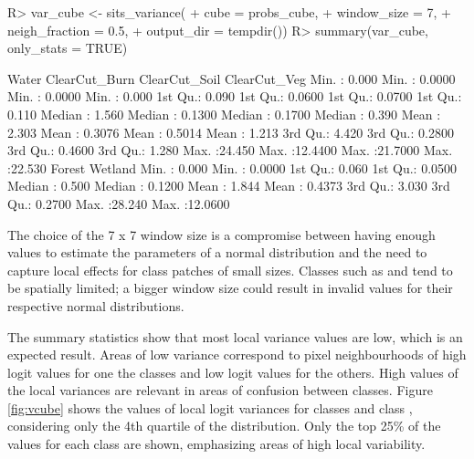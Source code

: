 \documentclass[
]{jss}
\begin{document}
\begin{CodeChunk}
\begin{CodeInput}
R> var_cube <- sits_variance(
+     cube = probs_cube,
+     window_size = 7,
+     neigh_fraction = 0.5,
+     output_dir = tempdir())
R> summary(var_cube, only_stats = TRUE)
\end{CodeInput}
\begin{CodeOutput}
 Water            ClearCut_Burn     ClearCut_Soil     ClearCut_Veg    
 Min.   : 0.000   Min.   : 0.0000   Min.   : 0.0000   Min.   : 0.000  
 1st Qu.: 0.090   1st Qu.: 0.0600   1st Qu.: 0.0700   1st Qu.: 0.110  
 Median : 1.560   Median : 0.1300   Median : 0.1700   Median : 0.390  
 Mean   : 2.303   Mean   : 0.3076   Mean   : 0.5014   Mean   : 1.213  
 3rd Qu.: 4.420   3rd Qu.: 0.2800   3rd Qu.: 0.4600   3rd Qu.: 1.280  
 Max.   :24.450   Max.   :12.4400   Max.   :21.7000   Max.   :22.530  
 Forest           Wetland          
 Min.   : 0.000   Min.   : 0.0000  
 1st Qu.: 0.060   1st Qu.: 0.0500  
 Median : 0.500   Median : 0.1200  
 Mean   : 1.844   Mean   : 0.4373  
 3rd Qu.: 3.030   3rd Qu.: 0.2700  
 Max.   :28.240   Max.   :12.0600  
\end{CodeOutput}
\end{CodeChunk}

The choice of the 7 x 7 window size is a compromise between having enough values to
estimate the parameters of a normal distribution and the need to capture local effects
for class patches of small sizes. Classes such as  and 
tend to be spatially limited; a bigger window size could result in invalid values for
their respective normal distributions.

The summary statistics show that most local variance values are low, which is an expected result. Areas of low variance correspond to pixel neighbourhoods of high logit values for one the classes and low logit values for the others. High values of the local variances are relevant in areas of confusion between classes. Figure \ref{fig:vcube} shows the values of local logit variances for classes  and class , considering only the 4th quartile of the distribution. Only the top 25\% of the values for each class are shown, emphasizing areas of high local variability.
\end{document}
